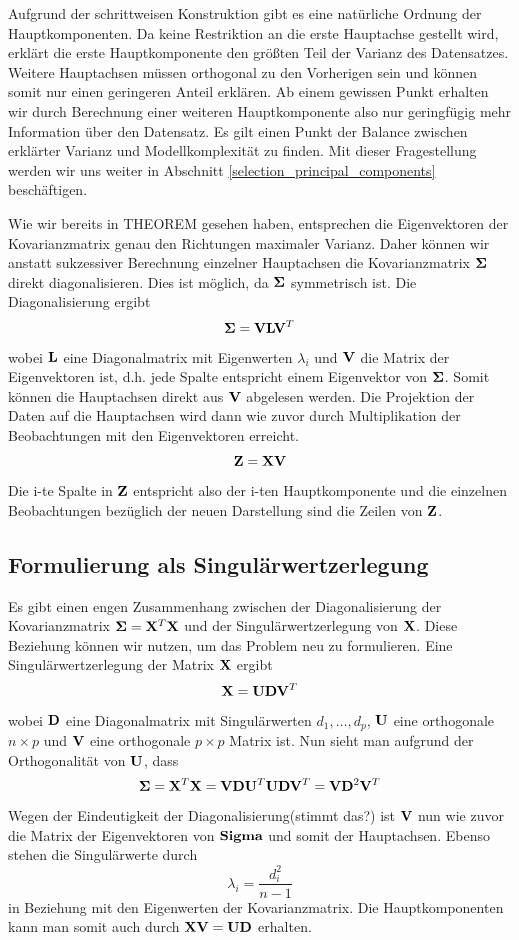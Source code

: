 Aufgrund der schrittweisen Konstruktion gibt es eine natürliche Ordnung der Hauptkomponenten. Da keine Restriktion an die erste Hauptachse gestellt wird, erklärt die erste Hauptkomponente den größten Teil der Varianz des Datensatzes. Weitere Hauptachsen müssen orthogonal zu den Vorherigen sein und können somit nur einen geringeren Anteil erklären. Ab einem gewissen Punkt erhalten wir durch Berechnung einer weiteren Hauptkomponente also nur geringfügig mehr Information über den Datensatz. Es gilt einen Punkt der Balance zwischen erklärter Varianz und Modellkomplexität zu finden. Mit dieser Fragestellung werden wir uns weiter in Abschnitt \ref{selection_principal_components} beschäftigen.

Wie wir bereits in THEOREM gesehen haben, entsprechen die Eigenvektoren der Kovarianzmatrix genau den Richtungen maximaler Varianz. Daher können wir anstatt sukzessiver Berechnung einzelner Hauptachsen die Kovarianzmatrix $\mathbf{\Sigma}$ direkt diagonalisieren. Dies ist möglich, da $\mathbf{\Sigma}$ symmetrisch ist. Die Diagonalisierung ergibt
$$\mathbf{\Sigma} = \mathbf{V} \mathbf{L} \mathbf{V}^T$$
wobei $\mathbf{L}$ eine Diagonalmatrix mit Eigenwerten $\lambda_i$ und $\mathbf{V}$ die Matrix der Eigenvektoren ist, d.h. jede Spalte entspricht einem Eigenvektor von $\mathbf{\Sigma}$. Somit können die Hauptachsen direkt aus $\mathbf{V}$ abgelesen werden. Die Projektion der Daten auf die Hauptachsen wird dann wie zuvor durch Multiplikation der Beobachtungen mit den Eigenvektoren erreicht. 
$$\mathbf{Z} = \mathbf{X} \mathbf{V}$$
Die i-te Spalte in $\mathbf{Z}$ entspricht also der i-ten Hauptkomponente und die einzelnen Beobachtungen bezüglich der neuen Darstellung sind die Zeilen von $\mathbf{Z}$.


\subsection{Formulierung als Singulärwertzerlegung}
Es gibt einen engen Zusammenhang zwischen der Diagonalisierung der Kovarianzmatrix $\mathbf{\Sigma} = \mathbf{X}^T \mathbf{X}$ und der Singulärwertzerlegung von $\mathbf{X}$. Diese Beziehung können wir nutzen, um das Problem neu zu formulieren. Eine Singulärwertzerlegung der Matrix $\mathbf{X}$ ergibt
$$ \mathbf{X} = \mathbf{U}\mathbf{D}\mathbf{V}^T $$
wobei $\mathbf{D}$ eine Diagonalmatrix mit Singulärwerten $d_1,\ldots,d_p$, $\mathbf{U}$ eine orthogonale $n \times p$ und $\mathbf{V}$ eine orthogonale $p \times p$ Matrix ist. Nun sieht man aufgrund der Orthogonalität von $\mathbf{U}$, dass
$$\mathbf{\Sigma} = \mathbf{X}^T \mathbf{X} = \mathbf{V}\mathbf{D}\mathbf{U}^T \mathbf{U}\mathbf{D}\mathbf{V}^T = \mathbf{V} \mathbf{D}^2 \mathbf{V}^T$$
Wegen der Eindeutigkeit der Diagonalisierung(stimmt das?) ist $\mathbf{V}$ nun wie zuvor die Matrix der Eigenvektoren von $\mathbf{Sigma}$ und somit der Hauptachsen. Ebenso stehen die Singulärwerte durch 
$$\lambda_i = \frac{d_i^2}{n-1}$$
in Beziehung mit den Eigenwerten der Kovarianzmatrix. Die Hauptkomponenten kann man somit auch durch $\mathbf{X} \mathbf{V} = \mathbf{U} \mathbf{D}$ erhalten.

